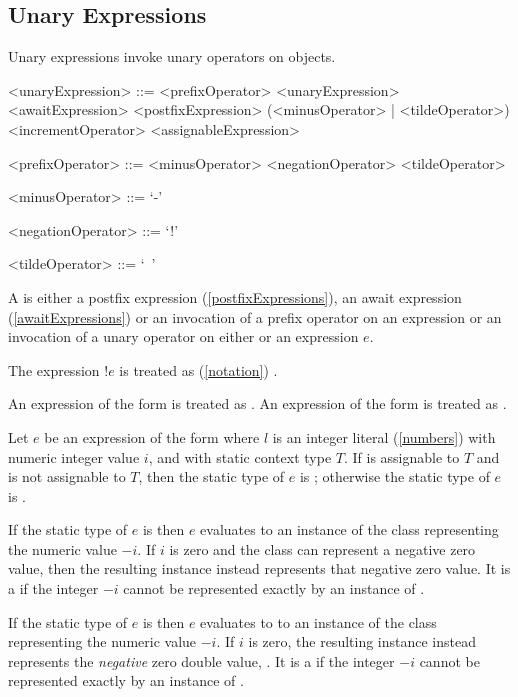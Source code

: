 \documentclass[makeidx]{article}
\begin{document}
{\subsection{Unary Expressions}

\LMHash{}%
Unary expressions invoke unary operators on objects.

\begin{grammar}
<unaryExpression> ::= <prefixOperator> <unaryExpression>
  \alt <awaitExpression>
  \alt <postfixExpression>
  \alt (<minusOperator> | <tildeOperator>) \SUPER{}
  \alt <incrementOperator> <assignableExpression>

<prefixOperator> ::= <minusOperator>
  \alt <negationOperator>
  \alt <tildeOperator>

<minusOperator> ::= `-'

<negationOperator> ::= `!'

<tildeOperator> ::= `~'
\end{grammar}

\LMHash{}%
A  is either a postfix expression
(\ref{postfixExpressions}),
an await expression (\ref{awaitExpressions})
or an invocation of a prefix operator on an expression
or an invocation of a unary operator on either \SUPER{} or an expression $e$.

\LMHash{}%
The expression $!e$ is treated as
(\ref{notation})
.

\LMHash{}%
An expression of the form  is treated as
.
An expression of the form  is treated as
.

\LMHash{}%
Let $e$ be an expression of the form 
where $l$ is an integer literal (\ref{numbers}) with numeric integer value $i$,
and with static context type $T$.
If  is assignable to $T$ and  is not assignable to $T$,
then the static type of $e$ is ;
otherwise the static type of $e$ is .

\LMHash{}%
If the static type of $e$ is  then $e$ evaluates to
an instance of the  class representing the numeric value $-i$.
If $i$ is zero and the  class can represent a negative zero value,
then the resulting instance instead represents that negative zero value.
It is a  if the integer $-i$ cannot be represented
exactly by an instance of .

\LMHash{}%
If the static type of $e$ is  then $e$ evaluates to
to an instance of the  class representing the numeric value $-i$.
If $i$ is zero, the resulting instance instead represents the
\emph{negative} zero double value, .
It is a  if the integer $-i$ cannot be represented
exactly by an instance of .

}
\end{document}
